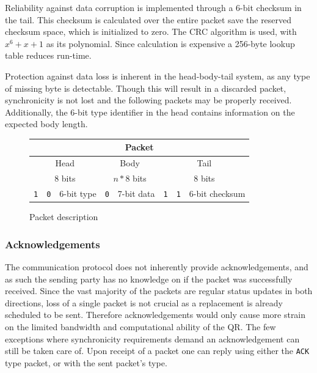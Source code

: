 \documentclass[11pt]{article}
\begin{document}
Reliability against data corruption is implemented through a 6-bit checksum in the tail. This checksum is calculated over the entire packet save the reserved checksum space, which is initialized to zero. The CRC algorithm is used, with $x^6 + x + 1$ as its polynomial. Since calculation is expensive a 256-byte lookup table reduces run-time.

Protection against data loss is inherent in the head-body-tail system, as any type of missing byte is detectable. Though this will result in a discarded packet, synchronicity is not lost and the following packets may be properly received. Additionally, the 6-bit type identifier in the head contains information on the expected body length.

\begin{figure}[h]
\centering
	\begin{tabular}{|c|c|c| c|c |c|c|c|}

		\hline
		\multicolumn{8}{|c|}{Packet} \\

		\hline
		\multicolumn{3}{|c|}{Head}	&
		\multicolumn{2}{c}{Body}	&
		\multicolumn{3}{|c|}{Tail}	\\
		\hline

		\multicolumn{3}{|c|}{8 bits}	&
		\multicolumn{2}{c}{$n * 8$ bits}	&
		\multicolumn{3}{|c|}{8 bits}	\\
		\hline

		\verb=1=	&	\verb=0=	&	6-bit type	&
		\verb=0=	&	7-bit data	&
		\verb=1=	&	\verb=1=	&	6-bit checksum	\\
		\hline
	\end{tabular}
	\caption{Packet description}
	\label{packet}
\end{figure}

\subsubsection{Acknowledgements}
The communication protocol does not inherently provide acknowledgements, and as such the sending party has no knowledge on if the packet was successfully received. Since the vast majority of the packets are regular status updates in both directions, loss of a single packet is not crucial as a replacement is already scheduled to be sent. Therefore acknowledgements would only cause more strain on the limited bandwidth and computational ability of the QR.
The few exceptions where synchronicity requirements demand an acknowledgement can still be taken care of. Upon receipt of a packet one can reply using either the \verb=ACK= type packet, or with the sent packet's type.
\end{document}
